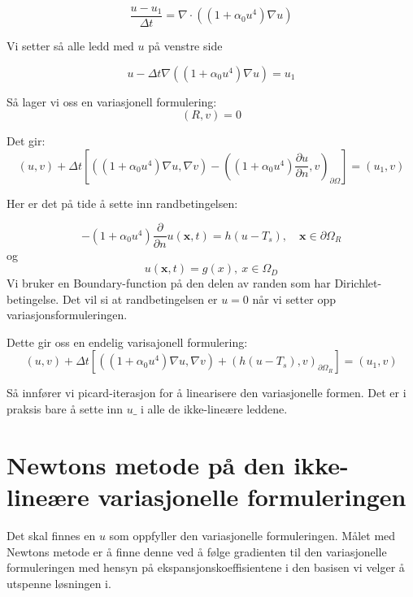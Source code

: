 \documentclass[a4paper, 10pt]{article}
\newcommand{\mb}{\mathbf}
\begin{document}
\begin{equation}
	\frac{u-u_1}{\Delta t} = \nabla \cdot ((1+\alpha_0u^4)\nabla u) 
\end{equation}

Vi setter så alle ledd med $u$ på venstre side

\begin{equation}
	u - \Delta t \nabla ((1+\alpha_0 u^4)\nabla u) = u_1 
\end{equation}

Så lager vi oss en variasjonell formulering:
\begin{equation}
(R, v) = 0
\end{equation}

Det gir:
\begin{equation}
	(u, v) + \Delta t \left[((1+\alpha_0u^4)\nabla u, \nabla v) - 
	\left( (1+\alpha_0 u^4) \frac{\partial u}{\partial n}, v \right)_{\partial \Omega}\right] = (u_1, v)
\end{equation}

Her er det på tide å sette inn randbetingelsen:

\begin{equation}
	-(1+\alpha_0u^4)\frac{\partial}{\partial n} u(\mb{x}, t) = h(u - T_s),\quad
\mb{x}\in\partial\Omega_R
\end{equation}
og 
\begin{equation}
	u(\mb{x}, t) = g(x), \ x\in \Omega_D
\end{equation}
Vi bruker en Boundary-function på den delen av randen som har Dirichlet-betingelse. Det vil si at randbetingelsen er $u=0$ når vi setter opp variasjonsformuleringen. 

Dette gir oss en endelig varisajonell formulering:
\begin{equation}
	(u, v) + \Delta t \left[((1+\alpha_0u^4)\nabla u, \nabla v) + 
	\left( h(u-T_s), v \right)_{\partial \Omega_R}\right] = (u_1, v)
\end{equation}

Så innfører vi picard-iterasjon for å linearisere den variasjonelle formen. Det er i praksis bare å sette inn $u\_$ i alle de ikke-lineære leddene. 


\section{Newtons metode på den ikke-lineære variasjonelle formuleringen}
Det skal finnes en $u$ som oppfyller den variasjonelle formuleringen. Målet med Newtons metode er å finne denne ved å følge gradienten til den variasjonelle formuleringen med hensyn på ekspansjonskoeffisientene i den basisen vi velger å utspenne løsningen i. 
\end{document}
